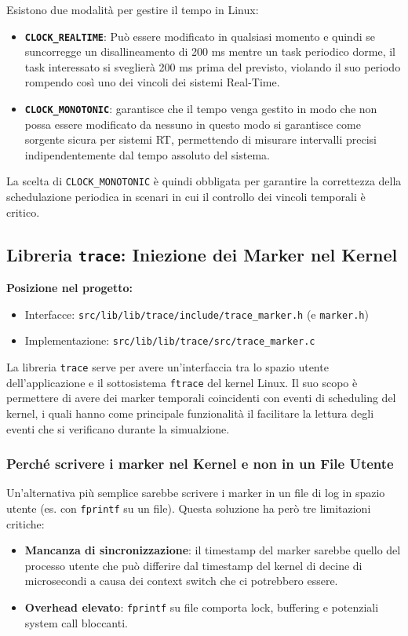Esistono due modalità per gestire il tempo in Linux:
\begin{itemize}
	\item \textbf{\texttt{CLOCK\_REALTIME}}: Può essere modificato in qualsiasi momento e quindi se suncorregge un disallineamento di 200 ms mentre un task periodico dorme, il task interessato si sveglierà 200 ms prima del previsto, violando il suo periodo rompendo così uno dei vincoli dei sistemi Real-Time.
	\item \textbf{\texttt{CLOCK\_MONOTONIC}}: garantisce che il tempo venga gestito in modo che non possa essere modificato da nessuno in questo modo si garantisce come sorgente sicura per sistemi RT, permettendo di misurare intervalli precisi indipendentemente dal tempo assoluto del sistema.
\end{itemize}

La scelta di \texttt{CLOCK\_MONOTONIC} è quindi obbligata per garantire la correttezza della schedulazione periodica in scenari in cui il controllo dei vincoli temporali è critico.

\subsection{Libreria \texttt{trace}: Iniezione dei Marker nel Kernel}
\label{sec:lib_trace}

\noindent\textbf{Posizione nel progetto:}
\begin{itemize}
	\item Interfacce: \texttt{src/lib/lib/trace/include/trace\_marker.h} (e \texttt{marker.h})
	\item Implementazione: \texttt{src/lib/lib/trace/src/trace\_marker.c}
\end{itemize}

La libreria \texttt{trace} serve per avere un'interfaccia tra lo spazio utente dell'applicazione e il sottosistema \texttt{ftrace} del kernel Linux. Il suo scopo è permettere di avere dei marker temporali coincidenti con eventi di scheduling del kernel, i quali hanno come principale funzionalità il facilitare la lettura degli eventi che si verificano durante la simualzione.

\subsubsection{Perché scrivere i marker nel Kernel e non in un File Utente}

Un'alternativa più semplice sarebbe scrivere i marker in un file di log in spazio utente (es. con \texttt{fprintf} su un file). Questa soluzione ha però tre limitazioni critiche:
\begin{itemize}
	\item \textbf{Mancanza di sincronizzazione}: il timestamp del marker sarebbe quello del processo utente che può differire dal timestamp del kernel di decine di microsecondi a causa dei context switch che ci potrebbero essere.
	\item \textbf{Overhead elevato}: \texttt{fprintf} su file comporta lock, buffering e potenziali system call bloccanti.
\end{itemize}

